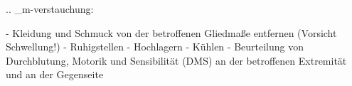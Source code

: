 
.. _m-verstauchung:


\begin{itemize}
  -   Kleidung und Schmuck von der betroffenen Gliedmaße entfernen
  (Vorsicht Schwellung!)
  -   Ruhigstellen
  -   Hochlagern
  -   Kühlen
  -   Beurteilung von Durchblutung, Motorik und
  Sensibilität (DMS) an der betroffenen Extremität und an
  der Gegenseite
\end{itemize}